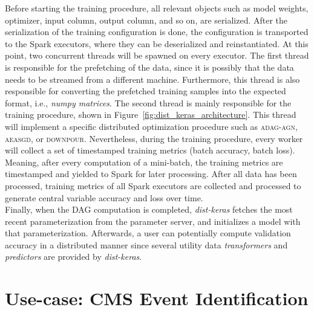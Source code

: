 Before starting the training procedure, all relevant objects such as model weights, optimizer, input column, output column, and so on, are serialized. After the serialization of the training configuration is done, the configuration is transported to the Spark executors, where they can be deserialized and reinstantiated. At this point, two concurrent threads will be spawned on every executor. The first thread is responsible for the prefetching of the data, since it is possibly that the data needs to be streamed from a different machine. Furthermore, this thread is also responsible for converting the prefetched training samples into the expected format, i.e., \emph{numpy matrices}. The second thread is mainly responsible for the training procedure, shown in Figure~\ref{fig:dist_keras_architecture}. This thread will implement a specific distributed optimization procedure such as \textsc{adag-agn}, \textsc{aeasgd}, or \textsc{downpour}. Nevertheless, during the training procedure, every worker will collect a set of timestamped training metrics (batch accuracy, batch loss). Meaning, after every computation of a mini-batch, the training metrics are timestamped and yielded to Spark for later processing. After all data has been processed, training metrics of all Spark executors are collected and processed to generate central variable accuracy and loss over time.\\

Finally, when the DAG computation is completed, \emph{dist-keras} fetches the most recent parameterization from the parameter server, and initializes a model with that parameterization. Afterwards, a user can potentially compute validation accuracy in a distributed manner since several utility data \emph{transformers} and \emph{predictors} are provided by \emph{dist-keras}.

\section{Use-case: CMS Event Identification}
\label{sec:experiment_track_reconstruction}

